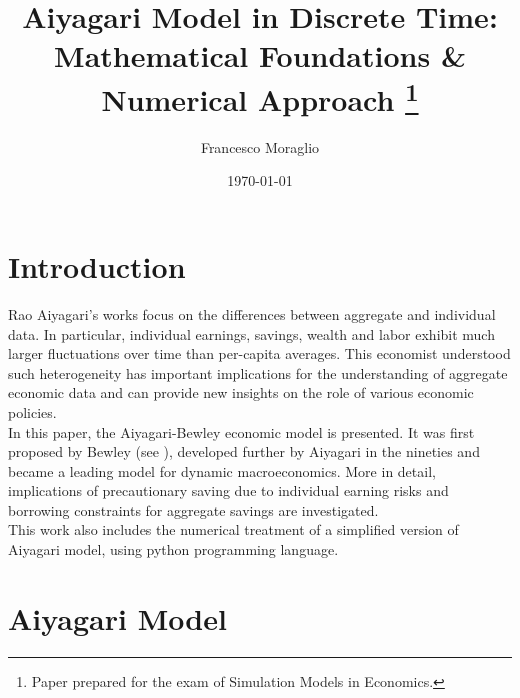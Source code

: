 \documentclass[12pt]{article}
\title{Aiyagari Model in Discrete Time: Mathematical Foundations \& Numerical Approach
\thanks{Paper prepared for the exam of Simulation Models in Economics.}
}
\author{Francesco Moraglio}
\date{\today}
\begin{document}
\maketitle


\section{Introduction}
Rao Aiyagari's works focus on the differences  between aggregate and individual data. In particular, individual earnings, savings, wealth and labor exhibit much larger fluctuations over time than per-capita averages. This economist understood such heterogeneity has important implications for the understanding of aggregate economic data and can provide new insights on the role of various economic policies. \\
In this paper, the Aiyagari-Bewley economic model is presented. It was first proposed by Bewley (see \cite{bewley}), developed further by Aiyagari in the nineties and became a leading model for dynamic macroeconomics. More in detail, implications of precautionary saving due to individual earning risks and borrowing constraints for aggregate savings are investigated. \\
This work also includes the numerical treatment of a simplified version of Aiyagari model, using python programming language.
\section{Aiyagari Model}
\end{document}
